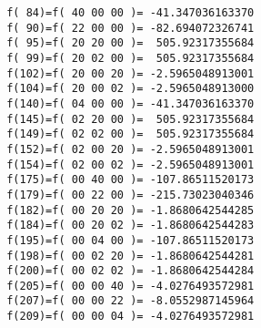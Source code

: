 \begin{footnotesize}
\begin{verbatim}
 f( 84)=f( 40 00 00 )= -41.347036163370
 f( 90)=f( 22 00 00 )= -82.694072326741
 f( 95)=f( 20 20 00 )=  505.92317355684
 f( 99)=f( 20 02 00 )=  505.92317355684
 f(102)=f( 20 00 20 )= -2.5965048913001
 f(104)=f( 20 00 02 )= -2.5965048913000
 f(140)=f( 04 00 00 )= -41.347036163370
 f(145)=f( 02 20 00 )=  505.92317355684
 f(149)=f( 02 02 00 )=  505.92317355684
 f(152)=f( 02 00 20 )= -2.5965048913001
 f(154)=f( 02 00 02 )= -2.5965048913001
 f(175)=f( 00 40 00 )= -107.86511520173
 f(179)=f( 00 22 00 )= -215.73023040346
 f(182)=f( 00 20 20 )= -1.8680642544285
 f(184)=f( 00 20 02 )= -1.8680642544283
 f(195)=f( 00 04 00 )= -107.86511520173
 f(198)=f( 00 02 20 )= -1.8680642544281
 f(200)=f( 00 02 02 )= -1.8680642544284
 f(205)=f( 00 00 40 )= -4.0276493572981
 f(207)=f( 00 00 22 )= -8.0552987145964
 f(209)=f( 00 00 04 )= -4.0276493572981
\end{verbatim}
\end{footnotesize}

\newpage
